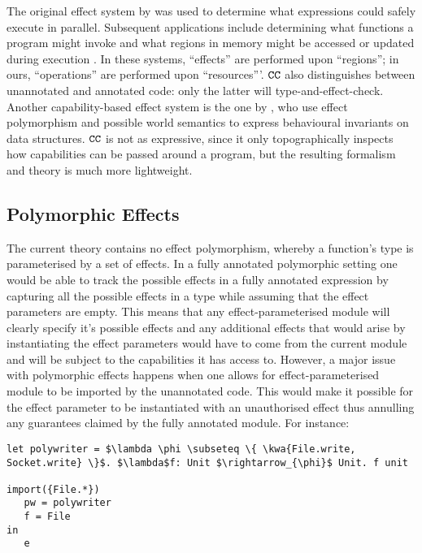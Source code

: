 The original effect system by \citet{lucassen88} was used to determine what expressions could safely execute in parallel. Subsequent applications include determining what functions a program might invoke \cite{tang94} and what regions in memory might be accessed or updated during execution \cite{talpin94}. In these systems, ``effects'' are performed upon ``regions''; in ours, ``operations'' are performed upon ``resources'''. $\mathtt{CC}$ also distinguishes between unannotated and annotated code: only the latter will type-and-effect-check. Another capability-based effect system is the one by \citet{devriese16}, who use effect polymorphism and possible world semantics to express behavioural invariants on data structures. $\mathtt{CC}$ is not as expressive, since it only topographically inspects how capabilities can be passed around a program, but the resulting formalism and theory is much more lightweight.

\subsection{Polymorphic Effects}

The current theory contains no effect polymorphism, whereby a function's type is parameterised by a set of effects.
In a fully annotated polymorphic setting one would be able to track the possible effects in a fully annotated expression by capturing all the possible effects in a type while assuming that the effect parameters are empty. This means that any effect-parameterised module will clearly specify it's possible effects and any additional effects that would arise by instantiating the effect parameters would have to come from the current module and will be subject to the capabilities it has access to. However, a major issue with polymorphic effects happens when one allows for effect-parameterised module to be imported by the unannotated code. This would make it possible for the effect parameter to be instantiated with an unauthorised effect thus annulling any guarantees claimed by the fully annotated module. For instance:

\begin{lstlisting}
let polywriter = $\lambda \phi \subseteq \{ \kwa{File.write, Socket.write} \}$. $\lambda$f: Unit $\rightarrow_{\phi}$ Unit. f unit

import({File.*}) 
   pw = polywriter
   f = File
in
   e
\end{lstlisting}

